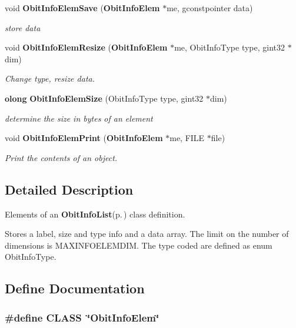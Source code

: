 \begin{CompactItemize}
void {\bf Obit\-Info\-Elem\-Save} ({\bf Obit\-Info\-Elem} $\ast$me, gconstpointer data)
\begin{CompactList}\small\item\em store data \item\end{CompactList}\item 
void {\bf Obit\-Info\-Elem\-Resize} ({\bf Obit\-Info\-Elem} $\ast$me, Obit\-Info\-Type type, gint32 $\ast$dim)
\begin{CompactList}\small\item\em Change type, resize data. \item\end{CompactList}\item 
{\bf olong} {\bf Obit\-Info\-Elem\-Size} (Obit\-Info\-Type type, gint32 $\ast$dim)
\begin{CompactList}\small\item\em determine the size in bytes of an element \item\end{CompactList}\item 
void {\bf Obit\-Info\-Elem\-Print} ({\bf Obit\-Info\-Elem} $\ast$me, FILE $\ast$file)
\begin{CompactList}\small\item\em Print the contents of an object. \item\end{CompactList}\end{CompactItemize}


\subsection{Detailed Description}
Elements of an {\bf Obit\-Info\-List}{\rm (p.\,\pageref{structObitInfoList})} class definition. 

Stores a label, size and type info and a data array. The limit on the number of dimensions is MAXINFOELEMDIM. The type coded are defined as enum Obit\-Info\-Type.

\subsection{Define Documentation}
\subsubsection{\setlength{\rightskip}{0pt plus 5cm}\#define CLASS\ \char`\"{}Obit\-Info\-Elem\char`\"{}}\label{ObitInfoElem_8h_a0}


